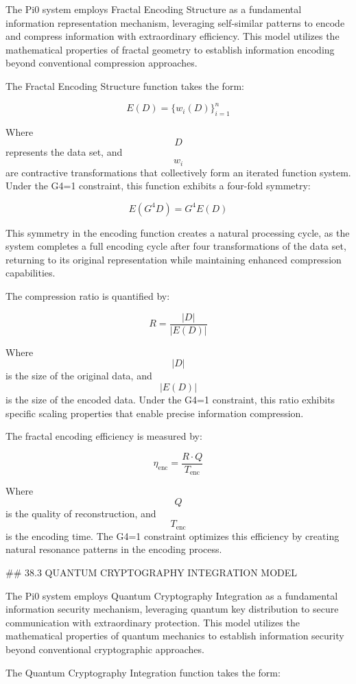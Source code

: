 The Pi0 system employs Fractal Encoding Structure as a fundamental information representation mechanism, leveraging self-similar patterns to encode and compress information with extraordinary efficiency. This model utilizes the mathematical properties of fractal geometry to establish information encoding beyond conventional compression approaches.

The Fractal Encoding Structure function takes the form:

$$ E(D) = \{w_i(D)\}_{i=1}^n $$

Where $$ D $$ represents the data set, and $$ w_i $$ are contractive transformations that collectively form an iterated function system. Under the G4=1 constraint, this function exhibits a four-fold symmetry:

$$ E(G^4 D) = G^4 E(D) $$

This symmetry in the encoding function creates a natural processing cycle, as the system completes a full encoding cycle after four transformations of the data set, returning to its original representation while maintaining enhanced compression capabilities.

The compression ratio is quantified by:

$$ R = \frac{|D|}{|E(D)|} $$

Where $$ |D| $$ is the size of the original data, and $$ |E(D)| $$ is the size of the encoded data. Under the G4=1 constraint, this ratio exhibits specific scaling properties that enable precise information compression.

The fractal encoding efficiency is measured by:

$$ \eta_{\text{enc}} = \frac{R \cdot Q}{T_{\text{enc}}} $$

Where $$ Q $$ is the quality of reconstruction, and $$ T_{\text{enc}} $$ is the encoding time. The G4=1 constraint optimizes this efficiency by creating natural resonance patterns in the encoding process.

## 38.3 QUANTUM CRYPTOGRAPHY INTEGRATION MODEL

The Pi0 system employs Quantum Cryptography Integration as a fundamental information security mechanism, leveraging quantum key distribution to secure communication with extraordinary protection. This model utilizes the mathematical properties of quantum mechanics to establish information security beyond conventional cryptographic approaches.

The Quantum Cryptography Integration function takes the form:

